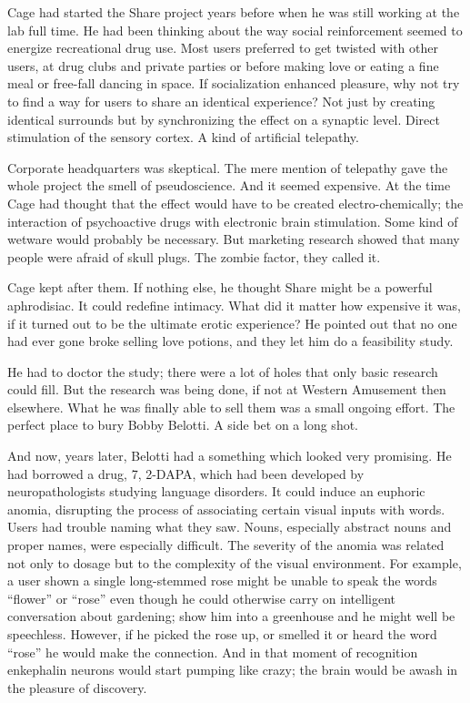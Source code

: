 Cage had started the Share project years before when he was still working at the lab full time. He had been thinking about the way social reinforcement seemed to energize recreational drug use. Most users preferred to get twisted with other users, at drug clubs and private parties or before making love or eating a fine meal or free-fall dancing in space. If socialization enhanced pleasure, why not try to find a way for users to share an identical experience? Not just by creating identical surrounds but by synchronizing the effect on a synaptic level. Direct stimulation of the sensory cortex. A kind of artificial telepathy.

Corporate headquarters was skeptical. The mere mention of telepathy gave the whole project the smell of pseudoscience. And it seemed expensive. At the time Cage had thought that the effect would have to be created electro-chemically; the interaction of psychoactive drugs with electronic brain stimulation. Some kind of wetware would probably be necessary. But marketing research showed that many people were afraid of skull plugs. The zombie factor, they called it.

Cage kept after them. If nothing else, he thought Share might be a powerful aphrodisiac. It could redefine intimacy. What did it matter how expensive it was, if it turned out to be the ultimate erotic experience? He pointed out that no one had ever gone broke selling love potions, and they let him do a feasibility study.

He had to doctor the study; there were a lot of holes that only basic research could fill. But the research was being done, if not at Western Amusement then elsewhere. What he was finally able to sell them was a small ongoing effort. The perfect place to bury Bobby Belotti. A side bet on a long shot.

And now, years later, Belotti had a something which looked very promising. He had borrowed a drug, 7, 2-DAPA, which had been developed by neuropathologists studying language disorders. It could induce an euphoric anomia, disrupting the process of associating certain visual inputs with words. Users had trouble naming what they saw. Nouns, especially abstract nouns and proper names, were especially difficult. The severity of the anomia was related not only to dosage but to the complexity of the visual environment. For example, a user shown a single long-stemmed rose might be unable to speak the words “flower” or “rose” even though he could otherwise carry on intelligent conversation about gardening; show him into a greenhouse and he might well be speechless. However, if he picked the rose up, or smelled it or heard the word “rose” he would make the connection. And in that moment of recognition enkephalin neurons would start pumping like crazy; the brain would be awash in the pleasure of discovery.

